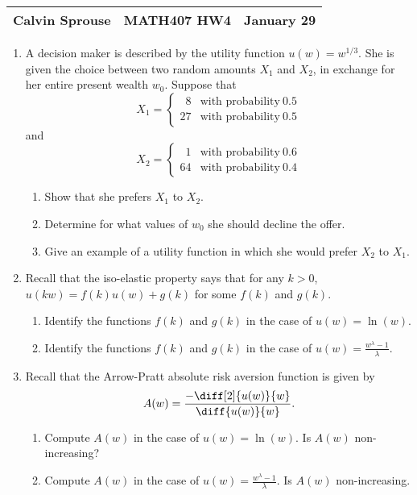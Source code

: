 \documentclass[a4paper, 12pt]{config/homework}
\begin{document}
\noindent
\begin{tabularx}{\textwidth}{>{\centering\arraybackslash}X>{\centering\arraybackslash}X>{\centering\arraybackslash}X}
Calvin Sprouse & MATH407 HW4 & 2024 January 29\\
\midrule
\end{tabularx}

\begin{enumerate}
\item A decision maker is described by the utility function \(u(w)=w^{1/3}\). She is given the choice between two random amounts \(X_1\) and \(X_2\), in exchange for her entire present wealth \(w_0\). Suppose that
\[X_1 = \begin{cases}
\phantom{0}8 & \text{with probability}\ 0.5 \\
27 & \text{with probability}\ 0.5
\end{cases}\] and
\[X_2 = \begin{cases}
\phantom{0}1 & \text{with probability}\ 0.6 \\
64 & \text{with probability}\ 0.4
\end{cases}\]
\begin{enumerate}[label=(\alph*)]
\item Show that she prefers \(X_1\) to \(X_2\).


\item Determine for what values of \(w_0\) she should decline the offer.


\item Give an example of a utility function in which she would prefer \(X_2\) to \(X_1\).


\end{enumerate}
\item Recall that the iso-elastic property says that for any \(k > 0\), \(u(kw) = f(k)u(w) + g(k)\) for some \(f(k)\) and \(g(k)\).
\begin{enumerate}[label=(\alph*)]
\item Identify the functions \(f(k)\) and \(g(k)\) in the case of \(u(w)=\ln(w)\).


\item Identify the functions \(f(k)\) and \(g(k)\) in the case of \(u(w)=\frac{w^\lambda - 1}{\lambda}\).


\end{enumerate}
\item Recall that the Arrow-Pratt absolute risk aversion function is given by
\[A(w) = \frac{-\diff[2]{u(w)}{w}}{\diff{u(w)}{w}}.\]
\begin{enumerate}[label=(\alph*)]
\item Compute \(A(w)\) in the case of \(u(w)=\ln(w)\). Is \(A(w)\) non-increasing?

\item Compute \(A(w)\) in the case of \(u(w)=\frac{w^{\lambda} - 1}{\lambda}\). Is \(A(w)\) non-increasing.


\end{enumerate}
\end{enumerate}
\end{document}
